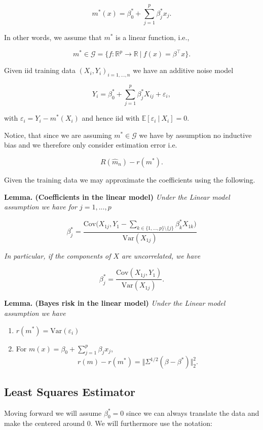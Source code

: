 \documentclass[
]{book}
\providecommand{\tightlist}{%
  \setlength{\itemsep}{0pt}\setlength{\parskip}{0pt}}
\begin{document}
\[
m^*(x)=\beta_0^*+\sum_{j=1}^{p}\beta_j^*x_j.
\]

In other words, we assume that \(m^*\) is a linear function, i.e.,

\[
m^*\in\mathcal{G}=\{f : \mathbb{R}^p\to \mathbb{R}\ \vert\ f(x)=\beta^\top x\}.
\]

Given iid training data \((X_i,Y_i)_{i=1,...,n}\) we have an additive noise model

\[
Y_i=\beta_0^*+\sum_{j=1}^{p}\beta_j^*X_{ij}+\varepsilon_i,
\]

with \(\varepsilon_i=Y_i-m^*(X_i)\) and hence iid with \(\mathbb{E}[\varepsilon_i\ \vert\ X_i]=0\).

Notice, that since we are assuming \(m^*\in\mathcal{G}\) we have by assumption no inductive bias and we therefore only consider estimation error i.e.

\[
R(\hat{m}_n)-r(m^*).
\]

Given the training data we may approximate the coefficients using the following.

\textbf{Lemma. (Coefficients in the linear model)} \emph{Under the Linear model assumption we have for \(j=1,...,p\)}

\[
\beta^*_j=\frac{\text{Cov}\Big(X_{1j},Y_1-\sum_{k\in \{1,...,p\}\setminus \{j\}} \beta_k^*X_{1k}\Big)}{\text{Var}(X_{1j})}
\]

\emph{In particular, if the components of \(X\) are uncorrelated, we have}

\[
\beta_j^*=\frac{\text{Cov}(X_{1j},Y_1)}{\text{Var}(X_{1j})}.
\]

\textbf{Lemma. (Bayes risk in the linear model)} \emph{Under the Linear model assumption we have}

\begin{enumerate}
\def\labelenumi{\arabic{enumi}.}
\tightlist
\item
  \(r(m^*)=\text{Var}(\varepsilon_i)\)
\item
  For \(m(x)=\beta_0+\sum_{j=1}^p \beta_jx_j\),
  \[
    r(m)-r(m^*)=\Vert\Sigma^{1/2}(\beta -\beta^*) \Vert^2_2.
    \]
\end{enumerate}

\hypertarget{least-squares-estimator}{%
\subsection{Least Squares Estimator}\label{least-squares-estimator}}

Moving forward we will assume \(\beta_0^*=0\) since we can always translate the data and make the centered around 0. We will furthermore use the notation:
\end{document}
